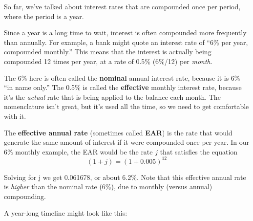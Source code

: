 \documentclass[14pt,twoside]{extarticle}
\begin{document}

So far, we've  talked about interest rates that are compounded once per period, where the period is a year.

Since a year is a long time to wait, interest is often compounded more frequently than annually.  For example,
a bank might quote an interest rate of ``6\% per year, compounded monthly.''  This means that the interest is
actually being compounded 12 times per year, at a rate of 0.5\% (6\%/12) per \emph{month}.

The 6\% here is often called the \textbf{nominal} annual interest rate, because it is 6\% ``in name only.'' The
0.5\% is called the \textbf{effective} monthly interest rate, because it's the \emph{actual} rate that is being
applied to the balance each month. The nomenclature isn't great, but it's used all the time, so we need to get
comfortable with it.

The \textbf{effective annual rate} (sometimes called \textbf{EAR}) is the rate that would generate the same amount of interest if it were
compounded once per year.  In our 6\% monthly example, the EAR would be the rate $j$ that satisfies the equation
\[
  (1 + j) = (1 + 0.005)^{12}
\]

Solving for j we get 0.061678, or about 6.2\%.  Note that this effective annual rate is \emph{higher} than the
nominal rate (6\%), due to monthly (versus annual) compounding.

A year-long timeline might look like this:

\begin{center}
\end{center}
\end{document}
